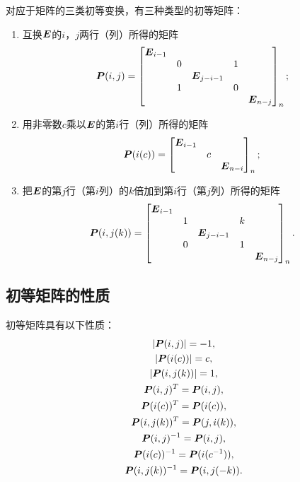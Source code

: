 对应于矩阵的三类初等变换，有三种类型的初等矩阵：
\begin{enumerate}
	\item 互换\(\boldsymbol{E}\)的\(i\)，\(j\)两行（列）所得的矩阵\[
		\boldsymbol{P}(i,j) = \begin{bmatrix}
			\boldsymbol{E}_{i-1} & & & \\
			& 0 & & 1 & \\
			& & \boldsymbol{E}_{j-i-1} & & \\
			& 1 & & 0 & \\
			& & & & \boldsymbol{E}_{n-j}
		\end{bmatrix}_n;
	\]
	\item 用非零数\(c\)乘以\(\boldsymbol{E}\)的第\(i\)行（列）所得的矩阵\[
		\boldsymbol{P}(i(c)) = \begin{bmatrix}
			\boldsymbol{E}_{i-1} & & \\
			& c & \\
			& & \boldsymbol{E}_{n-i}
		\end{bmatrix}_n;
	\]
	\item 把\(\boldsymbol{E}\)的第\(j\)行（第\(i\)列）的\(k\)倍加到第\(i\)行（第\(j\)列）所得的矩阵\[
		\boldsymbol{P}(i,j(k)) = \begin{bmatrix}
			\boldsymbol{E}_{i-1} & & & \\
			& 1 & & k & \\
			& & \boldsymbol{E}_{j-i-1} & & \\
			& 0 & & 1 & \\
			& & & & \boldsymbol{E}_{n-j}
		\end{bmatrix}_n.
	\]
\end{enumerate}

\subsection{初等矩阵的性质}
\begin{property}\label{theorem:逆矩阵.初等矩阵的性质1}
初等矩阵具有以下性质：\begin{gather}
	\abs{\boldsymbol{P}(i,j)} = -1, \\
	\abs{\boldsymbol{P}(i(c))} = c, \\
	\abs{\boldsymbol{P}(i,j(k))} = 1, \\
	\boldsymbol{P}(i,j)^T = \boldsymbol{P}(i,j), \\
	\boldsymbol{P}(i(c))^T = \boldsymbol{P}(i(c)), \\
	\boldsymbol{P}(i,j(k))^T = \boldsymbol{P}(j,i(k)), \\
	\boldsymbol{P}(i,j)^{-1} = \boldsymbol{P}(i,j), \\
	\boldsymbol{P}(i(c))^{-1} = \boldsymbol{P}(i(c^{-1})), \\
	\boldsymbol{P}(i,j(k))^{-1} = \boldsymbol{P}(i,j(-k)).
\end{gather}
\end{property}

